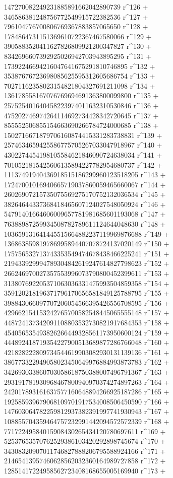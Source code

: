        147270082249231885891662042890739 r^126 + 
       346586381248756772549915722382536 r^127 + 
       796104776700806769367883857065650 r^128 + 
       1784864731151369610722367467580066 r^129 + 
       3905883520411627826809921200347827 r^130 + 
       8342696607392925026942703943895295 r^131 + 
       17392246694216047641675291810746895 r^132 + 
       35387676723698085625595312605686754 r^133 + 
       70271162358023154821804327691211098 r^134 + 
       136178558167076769694691363800099800 r^135 + 
       257525401640458223974011632310530846 r^136 + 
       475202746974264114692734428342720645 r^137 + 
       855552506855154663690266784724000685 r^138 + 
       1502716671879706160874415331283738831 r^139 + 
       2574634659425586775705267033047918967 r^140 + 
       4302274454198105584621846090724638034 r^141 + 
       7010521815425606135894227782954680737 r^142 + 
       11137491940436918515186299960123518205 r^143 + 
       17247001016940665719037860059465660067 r^144 + 
       26026907215735075569275170752132036534 r^145 + 
       38264644337368418465607124027548050924 r^146 + 
       54791401664606009657781981685601193068 r^147 + 
       76388987259934508782789611124644048630 r^148 + 
       103659131641445515664882237119969876688 r^149 + 
       136863859819786995894407078724137020149 r^150 + 
       175756532713743353549474678438466225241 r^151 + 
       219433929994789304842619247614827798623 r^152 + 
       266246970027357553996073790800452399611 r^153 + 
       313807692205371063036331475993504859358 r^154 + 
       359120218196371796170656581849125788795 r^155 + 
       398843066097707206054566395426556708595 r^156 + 
       429662154153242765700582548445065555148 r^157 + 
       448724137342091108803532730821917684353 r^158 + 
       454056535493826266449328561173950600124 r^159 + 
       444892418719354227900513689877286766048 r^160 + 
       421828222809734544619903082930131139136 r^161 + 
       386773322949058023450649976884993873783 r^162 + 
       342693033860703058618750388007496791367 r^163 + 
       293191781930968467800940970374274897263 r^164 + 
       242017893161637577160648894266925187286 r^165 + 
       192585939679068109701917534008506450590 r^166 + 
       147603064782259812937382391997741930943 r^167 + 
       108855704359464757232991442094572572339 r^168 + 
       77172249584015908430265434120780697611 r^169 + 
       52537653570762529386103420292898745674 r^170 + 
       34308320907011746827888206795588924166 r^171 + 
       21465413957460628562032360164989727858 r^172 + 
       12851417224958562723408168655005169940 r^173 + 
